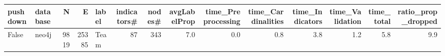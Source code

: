 \begin{tabular}{llrrlrrrrrrrrr}
\toprule
pushdown & database & N & E & label & indicators# & nodes# & avgLabelProp & time_Preprocessing & time_Cardinalities & time_Indicators & time_Validation & time_total & ratio_prop_dropped \\
\midrule
False & neo4j & 9819 & 25385 & Team & 87 & 343 & 7.0 & 0.0 & 0.8 & 3.8 & 1.2 & 5.8 & 9.9 \\
\bottomrule
\end{tabular}
